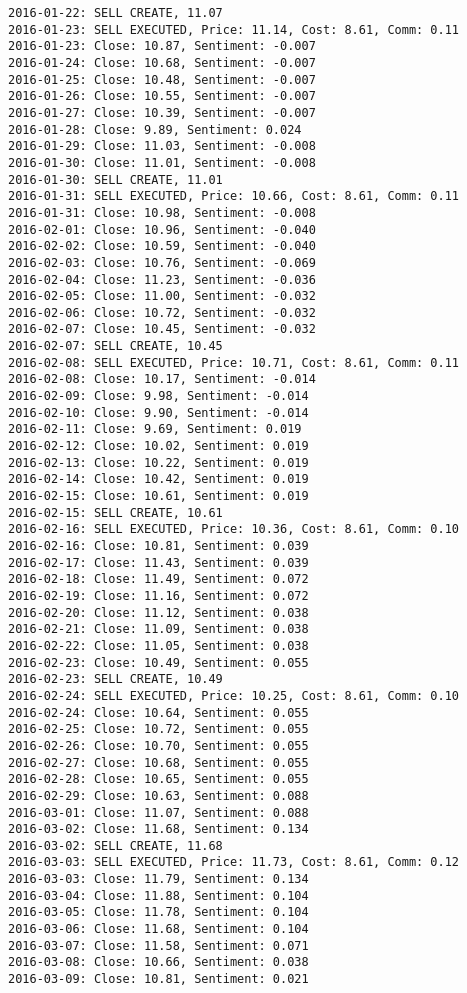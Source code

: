 \documentclass[11pt]{article}
\begin{document}
\begin{Verbatim}[commandchars=\\\{\}]
2016-01-22: SELL CREATE, 11.07
2016-01-23: SELL EXECUTED, Price: 11.14, Cost: 8.61, Comm: 0.11
2016-01-23: Close: 10.87, Sentiment: -0.007
2016-01-24: Close: 10.68, Sentiment: -0.007
2016-01-25: Close: 10.48, Sentiment: -0.007
2016-01-26: Close: 10.55, Sentiment: -0.007
2016-01-27: Close: 10.39, Sentiment: -0.007
2016-01-28: Close: 9.89, Sentiment: 0.024
2016-01-29: Close: 11.03, Sentiment: -0.008
2016-01-30: Close: 11.01, Sentiment: -0.008
2016-01-30: SELL CREATE, 11.01
2016-01-31: SELL EXECUTED, Price: 10.66, Cost: 8.61, Comm: 0.11
2016-01-31: Close: 10.98, Sentiment: -0.008
2016-02-01: Close: 10.96, Sentiment: -0.040
2016-02-02: Close: 10.59, Sentiment: -0.040
2016-02-03: Close: 10.76, Sentiment: -0.069
2016-02-04: Close: 11.23, Sentiment: -0.036
2016-02-05: Close: 11.00, Sentiment: -0.032
2016-02-06: Close: 10.72, Sentiment: -0.032
2016-02-07: Close: 10.45, Sentiment: -0.032
2016-02-07: SELL CREATE, 10.45
2016-02-08: SELL EXECUTED, Price: 10.71, Cost: 8.61, Comm: 0.11
2016-02-08: Close: 10.17, Sentiment: -0.014
2016-02-09: Close: 9.98, Sentiment: -0.014
2016-02-10: Close: 9.90, Sentiment: -0.014
2016-02-11: Close: 9.69, Sentiment: 0.019
2016-02-12: Close: 10.02, Sentiment: 0.019
2016-02-13: Close: 10.22, Sentiment: 0.019
2016-02-14: Close: 10.42, Sentiment: 0.019
2016-02-15: Close: 10.61, Sentiment: 0.019
2016-02-15: SELL CREATE, 10.61
2016-02-16: SELL EXECUTED, Price: 10.36, Cost: 8.61, Comm: 0.10
2016-02-16: Close: 10.81, Sentiment: 0.039
2016-02-17: Close: 11.43, Sentiment: 0.039
2016-02-18: Close: 11.49, Sentiment: 0.072
2016-02-19: Close: 11.16, Sentiment: 0.072
2016-02-20: Close: 11.12, Sentiment: 0.038
2016-02-21: Close: 11.09, Sentiment: 0.038
2016-02-22: Close: 11.05, Sentiment: 0.038
2016-02-23: Close: 10.49, Sentiment: 0.055
2016-02-23: SELL CREATE, 10.49
2016-02-24: SELL EXECUTED, Price: 10.25, Cost: 8.61, Comm: 0.10
2016-02-24: Close: 10.64, Sentiment: 0.055
2016-02-25: Close: 10.72, Sentiment: 0.055
2016-02-26: Close: 10.70, Sentiment: 0.055
2016-02-27: Close: 10.68, Sentiment: 0.055
2016-02-28: Close: 10.65, Sentiment: 0.055
2016-02-29: Close: 10.63, Sentiment: 0.088
2016-03-01: Close: 11.07, Sentiment: 0.088
2016-03-02: Close: 11.68, Sentiment: 0.134
2016-03-02: SELL CREATE, 11.68
2016-03-03: SELL EXECUTED, Price: 11.73, Cost: 8.61, Comm: 0.12
2016-03-03: Close: 11.79, Sentiment: 0.134
2016-03-04: Close: 11.88, Sentiment: 0.104
2016-03-05: Close: 11.78, Sentiment: 0.104
2016-03-06: Close: 11.68, Sentiment: 0.104
2016-03-07: Close: 11.58, Sentiment: 0.071
2016-03-08: Close: 10.66, Sentiment: 0.038
2016-03-09: Close: 10.81, Sentiment: 0.021

\end{Verbatim}
\end{document}
